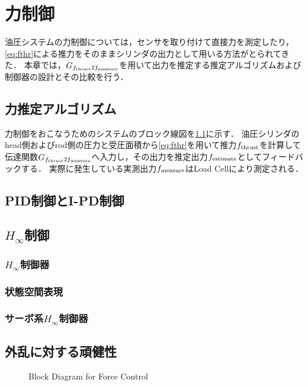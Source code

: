 \chapter{力制御}
油圧システムの力制御については，センサを取り付けて直接力を測定したり，\eqnname\ref{eq:fthr}による推力をそのままシリンダの出力として用いる方法がとられてきた\cite{semini2010design,semini2010hyq,川端健太郎20141a1,岡田大貴2017多自由度油圧駆動ロボットのシリンダ圧に基づく手先負荷力推定による力覚フィードバック}．
本章では，$G_{f_\mathrm{thrust}2f_\mathrm{measure}}$を用いて出力を推定する推定アルゴリズムおよび制御器の設計とその比較を行う．

\section{力推定アルゴリズム}
力制御をおこなうためのシステムのブロック線図を\figname\ref{fig:ForceEstimateControl}に示す．
油圧シリンダのhead側およびrod側の圧力と受圧面積から\eqnname\ref{eq:fthr}を用いて推力$f_\mathrm{thrust}$を計算して伝達関数$G_{f_\mathrm{thrust}2f_\mathrm{measure}}$へ入力し，その出力を推定出力$f_\mathrm{estimate}$としてフィードバックする．
実際に発生している実測出力$f_\mathrm{measure}$はLoad Cellにより測定される．
\section{PID制御とI-PD制御}

\section{$H_\infty$制御}
\subsection{$H_\infty$制御器}
\subsection{状態空間表現}
\subsection{サーボ系$H_\infty$制御器}

\section{外乱に対する頑健性}

\begin{figure}[t]
    \centering
        
        \caption{Block Diagram for Force Control}
        \label{fig:ForceEstimateControl}
\end{figure}